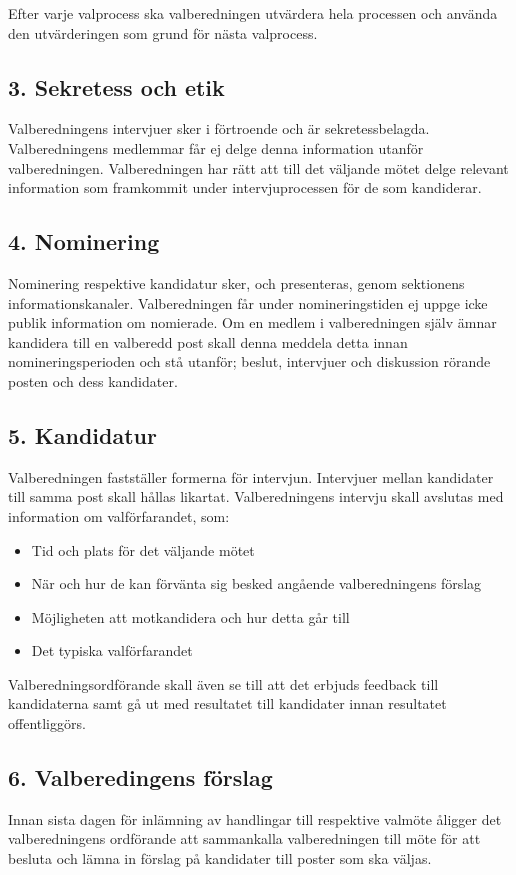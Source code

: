 \documentclass{dsekkallelse}
\begin{document}
Efter varje valprocess ska valberedningen utvärdera hela processen och använda den utvärderingen som grund för nästa valprocess.

\subsection{3. Sekretess och etik}
Valberedningens intervjuer sker i förtroende och är sekretessbelagda. Valberedningens medlemmar får ej delge denna information utanför valberedningen. Valberedningen har rätt att till
det väljande mötet delge relevant information som framkommit under intervjuprocessen för
de som kandiderar.

\subsection{4. Nominering}
Nominering respektive kandidatur sker, och presenteras, genom sektionens informationskanaler. Valberedningen får under nomineringstiden ej uppge icke publik information om nomierade. Om en medlem i valberedningen själv ämnar kandidera till en valberedd post skall
denna meddela detta innan nomineringsperioden och stå utanför; beslut, intervjuer och diskussion rörande posten och dess kandidater.

\subsection{5. Kandidatur}
Valberedningen fastställer formerna för intervjun. Intervjuer mellan kandidater till samma post
skall hållas likartat. Valberedningens intervju skall avslutas med information om valförfarandet, som:
\begin{itemize}
	\item Tid och plats för det väljande mötet
	\item När och hur de kan förvänta sig besked angående valberedningens förslag
	\item Möjligheten att motkandidera och hur detta går till
	\item Det typiska valförfarandet
\end{itemize}

Valberedningsordförande skall även se till att det erbjuds feedback till kandidaterna samt gå
ut med resultatet till kandidater innan resultatet offentliggörs.

\subsection{6. Valberedingens förslag}
Innan sista dagen för inlämning av handlingar till respektive valmöte åligger det valberedningens ordförande att sammankalla valberedningen till möte för att besluta och lämna in förslag
på kandidater till poster som ska väljas.
\end{document}
